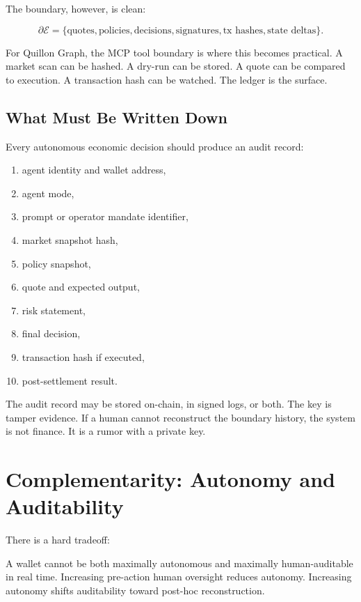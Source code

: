 \documentclass[11pt,a4paper]{article}
\begin{document}
The boundary, however, is clean:

\[
\partial \mathcal{E} =
\{\text{quotes}, \text{policies}, \text{decisions}, \text{signatures}, \text{tx hashes}, \text{state deltas}\}.
\]

For Quillon Graph, the MCP tool boundary is where this becomes practical. A market scan can be hashed. A dry-run can be stored. A quote can be compared to execution. A transaction hash can be watched. The ledger is the surface.

\subsection{What Must Be Written Down}

Every autonomous economic decision should produce an audit record:

\begin{enumerate}[leftmargin=1.2cm]
  \item agent identity and wallet address,
  \item agent mode,
  \item prompt or operator mandate identifier,
  \item market snapshot hash,
  \item policy snapshot,
  \item quote and expected output,
  \item risk statement,
  \item final decision,
  \item transaction hash if executed,
  \item post-settlement result.
\end{enumerate}

The audit record may be stored on-chain, in signed logs, or both. The key is tamper evidence. If a human cannot reconstruct the boundary history, the system is not finance. It is a rumor with a private key.

\section{Complementarity: Autonomy and Auditability}

There is a hard tradeoff:

\begin{principlebox}
A wallet cannot be both maximally autonomous and maximally human-auditable in real time. Increasing pre-action human oversight reduces autonomy. Increasing autonomy shifts auditability toward post-hoc reconstruction.
\end{principlebox}
\end{document}
